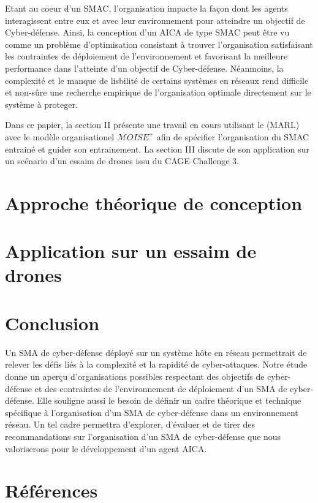\documentclass[conference]{IEEEtran}
\begin{document}
Etant au coeur d'un SMAC, l'organisation impacte la façon dont les agents interagissent entre eux et avec leur environnement pour atteindre un objectif de Cyber-défense. Ainsi, la conception d'un AICA de type SMAC peut être vu comme un problème d'optimisation consistant à trouver l'organisation satisfaisant les contraintes de déploiement de l'environnement et favorisant la meilleure performance dans l'atteinte d'un objectif de Cyber-défense.
Néanmoins, la complexité et le manque de lisbilité de certains systèmes en réseaux rend difficile et non-sûre une recherche empirique de l'organisation optimale directement sur le système à proteger.

Dans ce papier, la section II présente une travail en cours utilisant le  (MARL) avec le modèle organisationel $\mathcal{M}OISE^{+}$\cite{Hubner2002} afin de spécifier l'organisation du SMAC entrainé et guider son entrainement.
La section III discute de son application sur un scénario d'un essaim de drones issu du CAGE Challenge 3\cite{cage_challenge_3_announcement2022}.

\section{Approche théorique de conception}


\section{Application sur un essaim de drones}


\section{Conclusion}
Un SMA de cyber-défense déployé sur un système hôte en réseau permettrait de relever les défis liés à la complexité et la rapidité de cyber-attaques. Notre étude donne un aperçu d'organisations possibles respectant des objectifs de cyber-défense et des contraintes de l'environnement de déploiement d'un SMA de cyber-défense.
Elle souligne aussi le besoin de définir un cadre théorique et technique spécifique à l'organisation d'un SMA de cyber-défense dans un environnement réseau. Un tel cadre permettra d'explorer, d'évaluer et de tirer des recommandations sur l'organisation d'un SMA de cyber-défense que nous valoriserons pour le développement d'un agent AICA.

\section*{Références}


%


\end{document}
